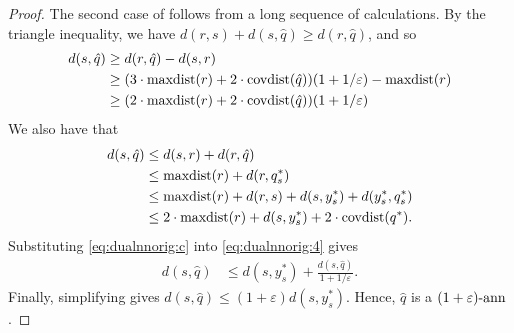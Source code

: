 \documentclass[../main.tex]{subfiles}
\newcommand{\dist}[2]{\distf({#1},{#2})}
\newcommand{\distf}{d}
\newcommand{\mkfunction}[1]{\ifmmode{\textnormal{{#1}}}}
\newcommand{\covdist}[1]    {\mkfunction{covdist}({#1})}
\newcommand{\maxdist}[1]    {\mkfunction{maxdist}({#1})}
\begin{document}
\begin{proof}
    The second case of follows from a long sequence of calculations.
    By the triangle inequality, we have
    $
        \dist {r}{s} + \dist{s}{\hat q}
        \ge \dist{r}{\hat q}
        $,
        and so
    \begin{align}
        \dist{s}{\hat q} 
        &\ge \dist{r}{\hat q} - \dist{s}{r}
        \label{eq:dualnnorig:a}
        \\&\ge (3\cdot\maxdist r+ 2\cdot\covdist{\hat q})(1+1/\varepsilon) - \maxdist{r}
        \label{eq:dualnnorig:b}
        \\&\ge (2\cdot\maxdist r+ 2\cdot\covdist{\hat q})(1+1/\varepsilon) 
        \label{eq:dualnnorig:c}
    \end{align}
    We also have that
    \begin{align}
        \dist{s}{\hat q} 
        &\le \dist{s}{r} + \dist{r}{\hat q}
        \label{eq:dualnnorig:1}
        \\&\le \maxdist{r} + \dist{r}{q^*_s}
        \label{eq:dualnnorig:2}
        \\&\le \maxdist{r} + \dist{r}{s} + \dist{s}{y^*_s} + \dist{y^*_s}{q^*_s}
        \label{eq:dualnnorig:3}
        \\&\le 2\cdot\maxdist{r} + \dist{s}{y^*_s} + 2\cdot\covdist{q^*}
        \label{eq:dualnnorig:4}
        .
    \end{align}
    Substituting \eqref{eq:dualnnorig:c} into \eqref{eq:dualnnorig:4} gives
    \begin{align}
        \dist{s}{\hat q} 
        &\le \dist{s}{y^*_s} + \frac{\dist{s}{\hat q}}{1+1/\varepsilon}
        .
    \end{align}
    Finally, simplifying gives $\dist{s}{\hat q} \le (1+\varepsilon)\dist{s}{y^*_s}$.
    Hence, $\hat q$ is a $(1+\varepsilon)\text{-ann}$.
\end{proof}

\end{document}
